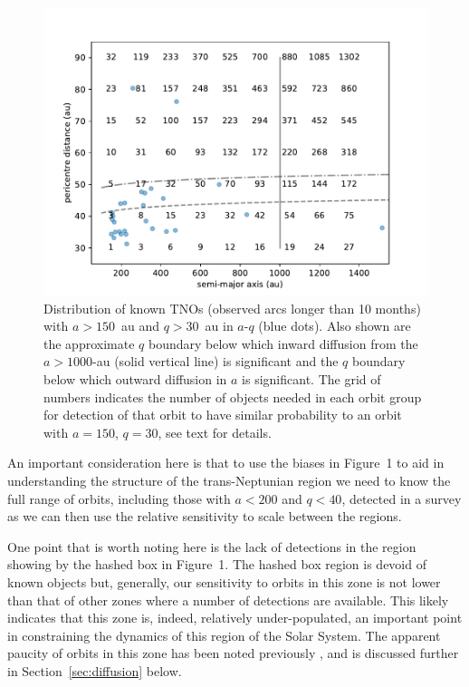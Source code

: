 \documentclass[preprint]{aastex62}
\begin{document}
\begin{figure}
\centering
\includegraphics[width=\textwidth]{figure1.pdf}
\caption{Distribution of known TNOs (observed arcs longer than 10 months) with $a > 150$~au and $q > 30$~au in $a$-$q$ (blue dots).  Also shown are the approximate $q$ boundary below which inward diffusion from the $a > 1000$-au (solid vertical line)  is significant and the $q$ boundary below which outward diffusion in $a$ is significant. The grid of numbers indicates the number of objects needed in each orbit group for detection of that orbit to have similar probability to an orbit with $a = 150$, $q = 30$, see text for details.}
\label{fig:bias}
\end{figure}

An important consideration here is that to use the biases in Figure~1 to aid in understanding the structure of the trans-Neptunian region we need to know the full range of orbits, including those with $a< 200$ and $q<40$, detected in a survey as we can then use the relative sensitivity to scale between the regions. 

One point that is worth noting here is the lack of detections in the region showing by the hashed box in Figure~1.  The hashed box region is devoid of known objects but, generally, our sensitivity to orbits in this zone is not lower than that of other zones where a number of detections are available.  This likely indicates that this zone is, indeed, relatively under-populated, an important point in constraining the dynamics of this region of the Solar System.  The apparent paucity of orbits in this zone has been noted previously \citep[e.g.][]{bannister18,sheppard18}, and is discussed further in Section~\ref{sec:diffusion} below.
\end{document}
